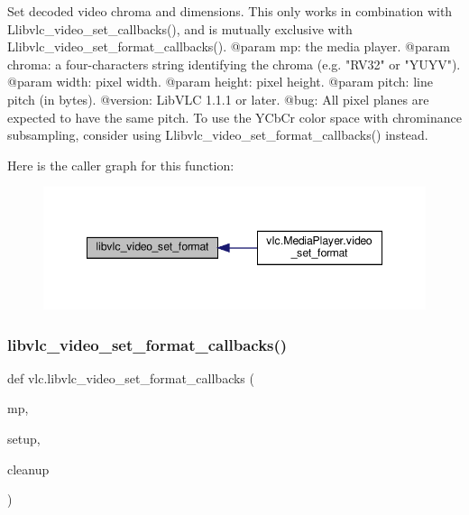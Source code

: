 \begin{DoxyVerb}Set decoded video chroma and dimensions.
This only works in combination with L{libvlc_video_set_callbacks}(),
and is mutually exclusive with L{libvlc_video_set_format_callbacks}().
@param mp: the media player.
@param chroma: a four-characters string identifying the chroma (e.g. "RV32" or "YUYV").
@param width: pixel width.
@param height: pixel height.
@param pitch: line pitch (in bytes).
@version: LibVLC 1.1.1 or later.
@bug: All pixel planes are expected to have the same pitch. To use the YCbCr color space with chrominance subsampling, consider using L{libvlc_video_set_format_callbacks}() instead.
\end{DoxyVerb}
 Here is the caller graph for this function\+:
\nopagebreak
\begin{figure}[H]
\begin{center}
\leavevmode
\includegraphics[width=348pt]{namespacevlc_acb41fcc3e8fb44271b3af9cfa0899473_icgraph}
\end{center}
\end{figure}
\mbox{\label{namespacevlc_a285e546903b5f0a9e27beb4d2763dab3}} 
\subsubsection{\texorpdfstring{libvlc\+\_\+video\+\_\+set\+\_\+format\+\_\+callbacks()}{libvlc\_video\_set\_format\_callbacks()}}
{\footnotesize\ttfamily def vlc.\+libvlc\+\_\+video\+\_\+set\+\_\+format\+\_\+callbacks (\begin{DoxyParamCaption}\item[{}]{mp,  }\item[{}]{setup,  }\item[{}]{cleanup }\end{DoxyParamCaption})}

